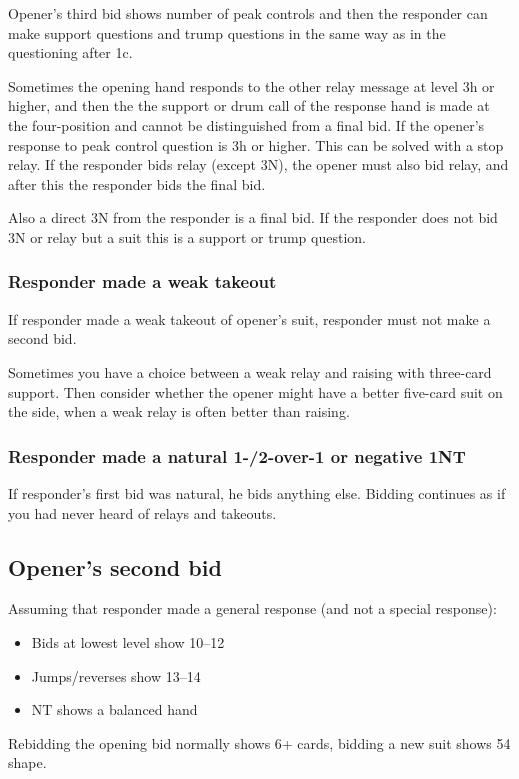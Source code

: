 \documentclass[a4paper, twoside, 11pt]{article}
\begin{document}
\begin{multicols}{3}
Opener's third bid shows
number of peak controls and then the responder can
make support questions and trump questions in the same way
as in the questioning after 1c.

Sometimes the opening hand responds to the other
relay message at level 3h or higher, and then the
the support or drum call of the response hand is made at the four-position
and cannot be distinguished from a final bid.
If the opener's response to
peak control question is 3h or higher.
This can
be solved with a stop relay.
If the responder bids relay
(except 3N), the opener must also bid relay,
and after this the responder bids the final bid.

Also
a direct 3N from the responder is a final bid. If
the responder does not bid 3N or relay but a suit
this is a support or trump question.

\subsubsection*{Responder made a weak takeout}
If responder made a weak takeout of opener's suit, responder must not make a second bid.

Sometimes you have a choice between a weak relay and
raising with three-card support. Then
consider whether the opener might have a better
five-card suit on the side, when a weak
relay is often better than raising.

\subsubsection*{Responder made a natural 1-/2-over-1 or negative \textnormal{1NT}}
If responder's first bid was natural, he bids anything else. Bidding continues as if you had never heard of relays and takeouts.


\subsection*{Opener's second bid}
Assuming that responder made a general response (and not a special response):
\begin{itemize}
    \item Bids at lowest level show 10--12
    \item Jumps/reverses show 13--14
    \item NT shows a balanced hand
\end{itemize}

Rebidding the opening bid normally shows 6+ cards, bidding a new suit shows 54 shape.


\end{multicols}
\end{document}
